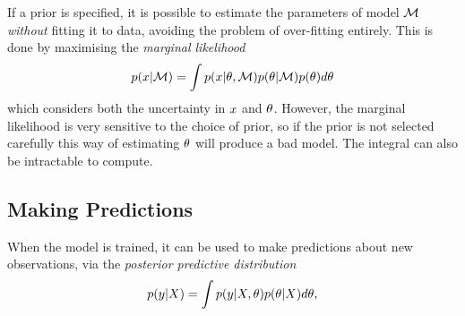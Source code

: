 If a prior is specified, it is possible to estimate the parameters of
model $\mathcal{M}$ \textit{without} fitting it to data, avoiding the
problem of over-fitting entirely. This is done by maximising the
\textit{marginal likelihood}
\begin{equation}
  \label{eq:marginal-likelihod}
  p(x \vert \mathcal{M}) = \int p(x \vert \theta,
  \mathcal{M}) p(\theta \vert \mathcal{M}) p(\theta) d\theta
\end{equation}
which considers both the uncertainty in $x$ and
$\theta$. However, the marginal likelihood is very sensitive to
the choice of prior, so if the prior is not selected carefully this
way of estimating $\theta$ will produce a bad model. The integral
can also be intractable to compute.

\subsection{Making Predictions}
When the model is trained, it can be used to make predictions
about new observations, via the \textit{posterior
  predictive distribution}
\begin{equation}
  \label{eq:posterior-predictive}
  p(y \vert X) = \int p(y|X,\theta)p(\theta \vert X) d \theta,
\end{equation}
